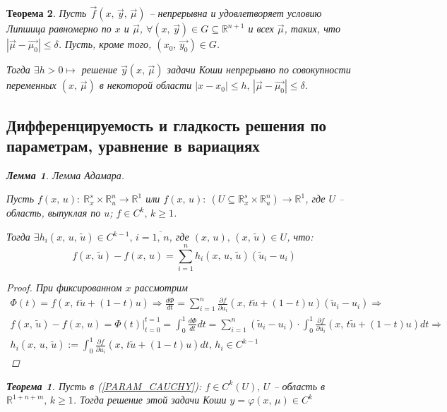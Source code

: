 \documentclass[a4paper,12pt]{article}
\renewcommand{\phi}{\ensuremath{\varphi}}
\renewcommand{\leq}{\ensuremath{\leqslant}}
\renewcommand{\geq}{\ensuremath{\geqslant}}
\theoremstyle{plain}
\newtheorem{theorem}{Теорема}[section]
\newtheorem{lemma}{Лемма}[section]
\theoremstyle{definition}
\theoremstyle{remark}
\begin{document}
\begin{theorem}
	Пусть $\vec{f}(x,\,\vec{y},\,\vec{\mu})$ -- непрерывна и удовлетворяет условию Липшица равномерно по $x$ и $\vec{\mu}$, $\forall (x,\,\vec{y}) \in G \subseteq \mathbb{R}^{n + 1}$ и всех $\vec{\mu}$, таких, что $|\vec{\mu} - \vec{\mu_0}| \leq \delta$. Пусть, кроме того, $(x_0,\, \vec{y_0}) \in G$.

	Тогда $\exists h > 0 \mapsto$ решение $\vec{y}(x,\,\vec{\mu})$ задачи Коши непрерывно по совокупности переменных $(x,\,\vec{\mu})$ в некоторой области $|x - x_0| \leq h,\, |\vec{\mu} - \vec{\mu_0}| \leq \delta$.

	\subsection{Дифференцируемость и гладкость решения по параметрам, уравнение в вариациях}

	\begin{lemma}
		Лемма Адамара.

		Пусть $f(x,\,u):\: \mathbb{R}^s_x \times \mathbb{R}^n_u \to \mathbb{R}^1$ или $f(x,\, u):\: (U \subseteq \mathbb{R}^s_x \times \mathbb{R}^n_u) \to \mathbb{R}^1$, где $U$ -- область, выпуклая по $u$; $f \in C^k,\, k \geq 1$.

		Тогда $\exists h_i(x,\,u,\,\tilde{u}) \in C^{k-1},\, i = \overline{1,\,n}$, где $(x,\,u),\, (x,\,\tilde{u}) \in U$, что:
		\[f(x,\,\tilde{u}) - f(x,\,u) = \sum_{i = 1}^n h_i(x,\,u,\,\tilde{u})(\tilde{u}_i - u_i)\]
	\end{lemma}

	\begin{proof}
		При фиксированном $x$ рассмотрим
		\begin{align*}
			\Phi(t) = f(x,\, t\tilde{u} + (1 - t)u) \Rightarrow \frac{d\Phi}{dt} = \sum_{i = 1}^n \frac{\partial f}{\partial u_i}(x,\, t\tilde{u} + (1 - t)u)(\tilde{u}_i - u_i) \Rightarrow                                     \\
			f(x,\,\tilde{u}) - f(x,\,u) = \Phi(t)|_{t = 0}^{t = 1} = \int_0^1 \frac{d\Phi}{dt} dt = \sum_{i = 1}^n (\tilde{u}_i - u_i) \cdot \int_0^1 \frac{\partial f}{\partial u_i}(x,\, t\tilde{u} + (1 - t)u) dt \Rightarrow \\
			h_i(x,\,u,\,\tilde{u}) := \int_0^1 \frac{\partial f}{\partial u_i}(x,\, t\tilde{u} + (1 - t)u) dt,\, h_i \in C^{k-1}
		\end{align*}
	\end{proof}

	\begin{theorem}
		Пусть в (\ref{PARAM_CAUCHY}): $f \in C^k(U),\, U$ -- область в $\mathbb{R}^{1 + n + m},\, k \geq 1$. Тогда решение этой задачи Коши $y = \phi(x,\, \mu) \in C^k$
	\end{theorem}


\end{theorem}
\end{document}
